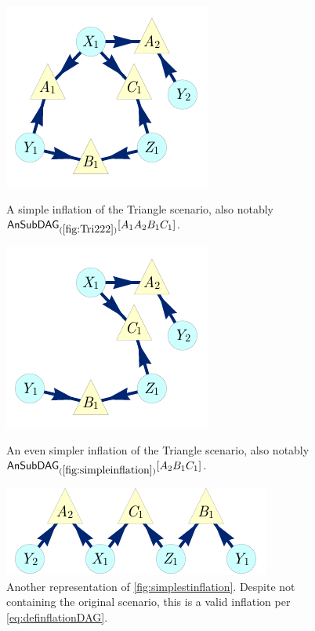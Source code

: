 {\begin{figure}[t]
\centering
\begin{minipage}[t]{0.3\linewidth}
\centering
\includegraphics[scale=1]{broadcastingexamplenohighlight.pdf}
\caption{A simple inflation of the Triangle scenario, also notably $\ansubgraph[(\cref{fig:Tri222})]{A_1 A_2 B_1 C_1}$.}\label{fig:simpleinflation}
\end{minipage}\hfill
\begin{minipage}[t]{0.275\linewidth}
\centering
\includegraphics[scale=1]{nobroadcastingexamplenohighlight.pdf}
\caption{An even simpler inflation of the Triangle scenario, also notably $\ansubgraph[(\cref{fig:simpleinflation})]{A_2 B_1 C_1}$. }\label{fig:simplestinflation}
\end{minipage}
\hfill
\begin{minipage}[t]{0.325\linewidth}
\centering
\includegraphics[scale=1]{TriDagSubA2B1C1.pdf}
\caption{Another representation of \cref{fig:simplestinflation}. Despite not containing the original scenario, this is a valid inflation per \cref{eq:definflationDAG}.}\label{fig:TriDagSubA2B1C1}
\end{minipage}
\end{figure}

}
